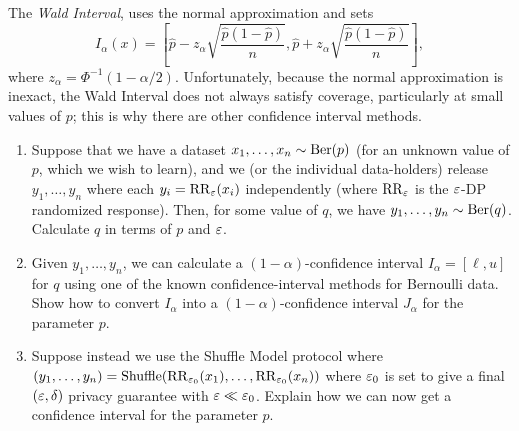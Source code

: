 \documentclass[11pt]{article}
\begin{document}
\begin{enumerate}[leftmargin=*]
The {\em Wald Interval}, uses the normal approximation and sets $$I_\alpha(x) = \left[\hat{p}-z_\alpha\sqrt{\frac{\hat{p}(1-\hat{p})}{n}},\hat{p}+z_\alpha\sqrt{\frac{\hat{p}(1-\hat{p})}{n}}\right],$$
where $z_\alpha = \Phi^{-1}(1-\alpha/2)$.
Unfortunately, because the normal approximation is inexact, the Wald Interval does not always satisfy coverage, particularly at small values of $p$; this is why there are other confidence interval methods. 

\begin{enumerate}

\item Suppose that we have a dataset $x_1,\ldots,x_n\sim \mathrm{Ber}(p)$ (for an unknown value of $p$, which we wish to learn), and we (or the individual data-holders) release $y_1,\ldots,y_n$ where each $y_i=\mathrm{RR}_\varepsilon(x_i)$ independently (where $\mathrm{RR}_\varepsilon$ is the $\varepsilon$-DP randomized response).  Then, for some value of $q$, we have $y_1,\ldots,y_n\sim \mathrm{Ber}(q)$.  Calculate $q$ in terms of $p$ and $\varepsilon$.

\item Given $y_1,\ldots,y_n$, we can calculate a $(1-\alpha)$-confidence interval $I_\alpha = [\ell,u]$ for $q$ using one of the known confidence-interval methods for Bernoulli data.  Show how to convert $I_\alpha$ into a $(1-\alpha)$-confidence interval $J_\alpha$ for the parameter $p$. 


\item Suppose instead we use the Shuffle Model protocol where $(y_1,\ldots,y_n) = \mathrm{Shuffle}(\mathrm{RR}_{\varepsilon_0}(x_1),\ldots,\mathrm{RR}_{\varepsilon_0}(x_n))$ where $\varepsilon_0$ is set to give a final $(\varepsilon,\delta)$ privacy guarantee with $\varepsilon \ll \varepsilon_0$.  Explain how we can now get a confidence interval for the parameter $p$.
\end{enumerate}
\end{enumerate}
\end{document}
